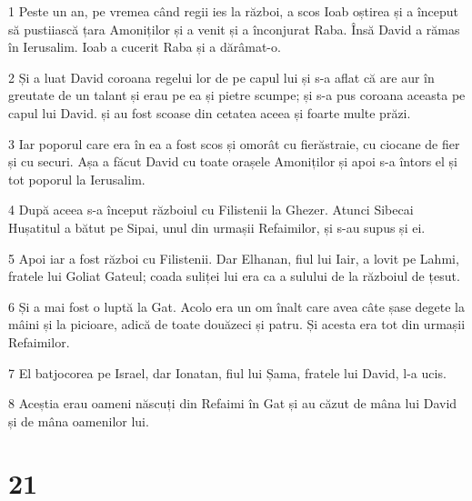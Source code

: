 \par 1 Peste un an, pe vremea când regii ies la război, a scos Ioab oștirea și a început să pustiiască țara Amoniților și a venit și a înconjurat Raba. Însă David a rămas în Ierusalim. Ioab a cucerit Raba și a dărâmat-o.
\par 2 Și a luat David coroana regelui lor de pe capul lui și s-a aflat că are aur în greutate de un talant și erau pe ea și pietre scumpe; și s-a pus coroana aceasta pe capul lui David. și au fost scoase din cetatea aceea și foarte multe prăzi.
\par 3 Iar poporul care era în ea a fost scos și omorât cu fierăstraie, cu ciocane de fier și cu securi. Așa a făcut David cu toate orașele Amoniților și apoi s-a întors el și tot poporul la Ierusalim.
\par 4 După aceea s-a început războiul cu Filistenii la Ghezer. Atunci Sibecai Hușatitul a bătut pe Sipai, unul din urmașii Refaimilor, și s-au supus și ei.
\par 5 Apoi iar a fost război cu Filistenii. Dar Elhanan, fiul lui Iair, a lovit pe Lahmi, fratele lui Goliat Gateul; coada suliței lui era ca a sulului de la războiul de țesut.
\par 6 Și a mai fost o luptă la Gat. Acolo era un om înalt care avea câte șase degete la mâini și la picioare, adică de toate douăzeci și patru. Și acesta era tot din urmașii Refaimilor.
\par 7 El batjocorea pe Israel, dar Ionatan, fiul lui Șama, fratele lui David, l-a ucis.
\par 8 Aceștia erau oameni născuți din Refaimi în Gat și au căzut de mâna lui David și de mâna oamenilor lui.

\chapter{21}

